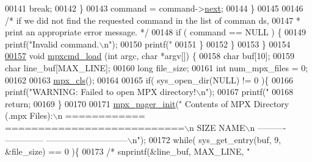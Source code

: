 \begin{DoxyCode}
{{{00141                                 \textcolor{keywordflow}{break};
00142                         \}
00143                         command = command->\hyperlink{structmpx__cmd_a863c991d0d31b283791615b5f5fe03bb}{next};
00144                 \}
00145 
00146                 \textcolor{comment}{/* if we did not find the requested command in the list of comman
      ds,}
00147 \textcolor{comment}{                 * print an appropriate error message. */}
00148                 \textcolor{keywordflow}{if} ( command == NULL ) \{
00149                          printf(\textcolor{stringliteral}{"Invalid command.\(\backslash\)n"});
00150                          printf(\textcolor{stringliteral}{"%
00151                 \}
00152         \}
00153 \}
00154 
\hypertarget{_m_p_x___c_m_d_8_c_source_l00157}{}\hyperlink{mpx__cmd_8h_ab121952706478a3ce5951ab91298d391}{00157} \textcolor{keywordtype}{void} \hyperlink{_m_p_x___c_m_d_8_c_ab121952706478a3ce5951ab91298d391}{mpxcmd_load} (\textcolor{keywordtype}{int} argc, \textcolor{keywordtype}{char} *argv[]) \{
00158         \textcolor{keywordtype}{char} buf[10];
00159         \textcolor{keywordtype}{char} line\_buf[MAX\_LINE];
00160         \textcolor{keywordtype}{long} file\_size;
00161         \textcolor{keywordtype}{int}  num\_mpx\_files = 0;
00162 
00163         \hyperlink{mpx__util_8c_a8cf3281978ba1652fd5d643e1a41f70b}{mpx_cls}();
00164 
00165         \textcolor{keywordflow}{if}( sys\_open\_dir(NULL) != 0 )\{ 
00166                 printf(\textcolor{stringliteral}{"WARNING: Failed to open MPX directory!\(\backslash\)n"});
00167                 printf(\textcolor{stringliteral}{"%
00168                 \textcolor{keywordflow}{return};
00169         \}
00170 
00171         \hyperlink{mpx__util_8c_a60afdb7496b6ff469c6b98d2ecde15ed}{mpx_pager_init}(\textcolor{stringliteral}{"  Contents of MPX Directory (.mpx Files):\(\backslash\)n  ============
      ===========================\(\backslash\)n    SIZE        NAME\(\backslash\)n    ----------  --------------
      -----------------------------\(\backslash\)n"});
00172         \textcolor{keywordflow}{while}( sys\_get\_entry(buf, 9, &file\_size) == 0 )\{ 
00173                 \textcolor{comment}{/* snprintf(&line\_buf, MAX\_LINE, "    %
}}}}}}
\end{DoxyCode}
